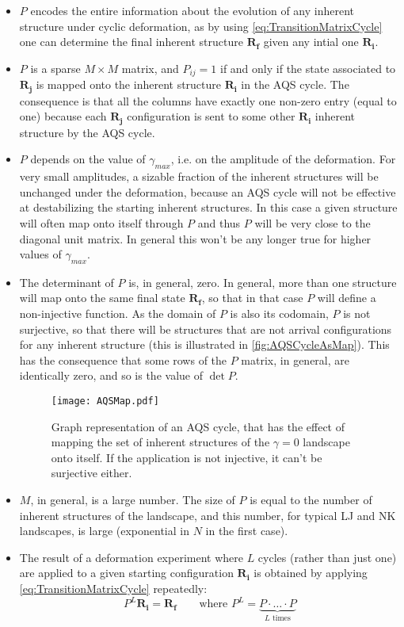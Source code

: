 \begin{itemize}
	\item $P$ encodes the entire information about the evolution of any inherent structure under cyclic deformation, as by using \autoref{eq:TransitionMatrixCycle} one can determine the final inherent structure $\mathbf{R_{f}}$ given any intial one $\mathbf{R_{i}}$.
	\item $P$ is a sparse $M \times M$ matrix, and $P_{ij} = 1$ if and only if the state associated to $\mathbf{R_{j}}$ is mapped onto the inherent structure $\mathbf{R_{i}}$ in the AQS cycle. The consequence is that all the columns have exactly one non-zero entry (equal to one) because each $\mathbf{R_{j}}$ configuration is sent to some other $\mathbf{R_{i}}$ inherent structure by the AQS cycle.
	\item $P$ depends on the value of $\gamma_{max}$, i.e. on the amplitude of the deformation. For very small amplitudes, a sizable fraction of the inherent structures will be unchanged under the deformation, because an AQS cycle will not be effective at destabilizing the starting inherent structures. In this case a given structure will often map onto itself through $P$ and thus $P$ will be very close to the diagonal unit matrix. In general this won't be any longer true for higher values of $\gamma_{max}$.
	\item The determinant of $P$ is, in general, zero. In general, more than one structure will map onto the same final state $\mathbf{R_{f}}$, so that in that case $P$ will define a non-injective function. As the domain of $P$ is also its codomain, $P$ is not surjective, so that there will be structures that are not arrival configurations for any inherent structure (this is illustrated in \autoref{fig:AQSCycleAsMap}). This has the consequence that some rows of the $P$ matrix, in general, are identically zero, and so is the value of $\det P$.
	
	\begin{figure}
	\centering 
	\texttt{[image: AQSMap.pdf]} 
	\caption{Graph representation of an AQS cycle, that has the effect of mapping the set of inherent structures of the $\gamma = 0$ landscape onto itself. If the application is not injective, it can't be surjective either.\label{fig:AQSCycleAsMap}}
	\end{figure}
	
	\item $M$, in general, is a large number. The size of $P$ is equal to the number of inherent structures of the landscape, and this number, for typical LJ and NK landscapes, is large (exponential in $N$ in the first case).
	\item The result of a deformation experiment where $L$ cycles (rather than just one) are applied to a given starting configuration $\mathbf{R_{i}}$ is obtained by applying \autoref{eq:TransitionMatrixCycle} repeatedly:
	\begin{equation}
		P^{L} \mathbf{R_{i}} = \mathbf{R_{f}} \qquad \text{where } P^{L} = \underbrace{P \cdot \ldots \cdot P}_{L\text{ times}}
	\end{equation} 
\end{itemize}

